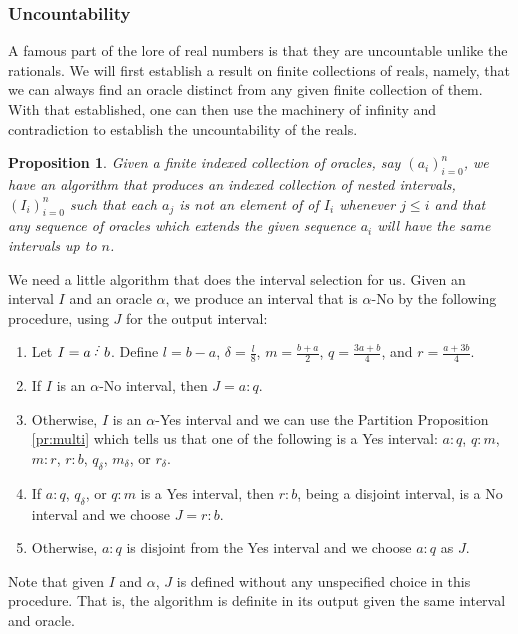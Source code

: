 \documentclass[12pt]{article}
\newtheorem{proposition}{Proposition}[subsection]
\begin{document}
\subsubsection{Uncountability}

A famous part of the lore of real numbers is that they are uncountable unlike the rationals. We will first establish a result on finite collections of reals, namely, that we can always find an oracle distinct from any given finite collection of them. With that established, one can then use the machinery of infinity and contradiction to establish the uncountability of the reals. 

\begin{proposition}\label{pr:notlist}
Given a finite indexed collection of oracles, say $(a_i)_{i=0}^n$, we have an algorithm that produces an indexed collection of nested intervals, $(I_i)_{i=0}^n$ such that each $a_j$ is not an element of of $I_i$ whenever $j \leq i$ and that any sequence of oracles which extends the given sequence $a_i$ will have the same intervals up to $n$. 
\end{proposition}

We need a little algorithm that does the interval selection for us. Given an interval $I$ and an oracle $\alpha$, we produce an interval that is $\alpha$-No by the following procedure, using $J$ for the output interval: 

\begin{enumerate}
    \item Let $I = a\lte b$. Define $l = b-a$, $\delta = \frac{l}{8}$, $m = \frac{b+a}{2}$, $q = \frac{3a +b}{4}$, and $r = \frac{a+3b}{4}$. 
    \item If $I$ is an $\alpha$-No interval, then $J=a:q$.
    \item Otherwise, $I$ is an $\alpha$-Yes interval and we can use the Partition Proposition \ref{pr:multi} which tells us that one of the following is a Yes interval: $a:q$, $q:m$, $m:r$, $r:b$, $q_\delta$, $m_\delta$, or $r_\delta$.
    \item If $a:q$, $q_\delta$, or $q:m$ is a Yes interval, then $r:b$, being a disjoint interval, is a No interval and we choose $J = r:b$.
    \item Otherwise, $a:q$ is disjoint from the Yes interval and we choose $a:q$ as $J$. 
\end{enumerate}

Note that given $I$ and $\alpha$, $J$ is defined without any unspecified choice in this procedure. That is, the algorithm is definite in its output given the same interval and oracle. 
\end{document}
